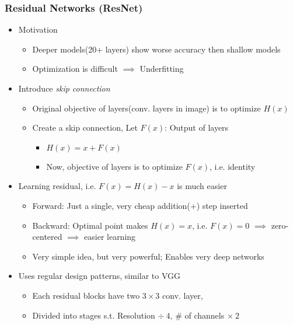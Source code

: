\subsubsection*{Residual Networks (ResNet)}
\begin{itemize}
    \item Motivation
    \begin{itemize}
        \item Deeper models(20+ layers) show worse accuracy then shallow models
        \item Optimization is difficult $\implies$ Underfitting
    \end{itemize}
    \item Introduce \textit{skip connection}
    \begin{itemize}
        \item Original objective of layers(conv. layers in image) is to optimize $H(x)$
        \item Create a skip connection, Let $F(x)$: Output of layers
        \begin{itemize}
            \item $H(x)=x+F(x)$
            \item Now, objective of layers is to optimize $F(x)$, i.e. identity
        \end{itemize}
    \end{itemize}
    \begin{figures}
    \end{figures}
    \item Learning residual, i.e. $F(x)=H(x)-x$ is much easier
    \begin{itemize}
        \item Forward: Just a single, very cheap addition(+) step inserted
        \item Backward: Optimal point makes $H(x)=x$, i.e. $F(x)=0$ $\implies$ zero-centered $\implies$ easier learning
        \item Very simple idea, but very powerful; Enables very deep networks
    \end{itemize}
    \item Uses regular design patterns, similar to VGG
    \begin{itemize}
        \item Each residual blocks have two $3\times3$ conv. layer,
        \item Divided into stages s.t. Resolution $\div~4$, \# of channels $\times~2$

\end{itemize}
\end{itemize}
